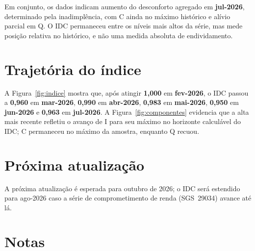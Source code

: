 \documentclass[11pt,a4paper]{article}
\newcommand{\mesref}{jul-2026}
\newcommand{\proxdivulgacao}{outubro de 2026}
\newcommand{\mesproximo}{ago-2026}
\begin{document}
Em conjunto, os dados indicam aumento do desconforto agregado em
\textbf{\mesref}, determinado pela inadimplência, com C ainda no máximo
histórico e alívio parcial em Q. O IDC permaneceu entre os níveis mais altos
da série, mas mede posição relativa no histórico, e não uma medida absoluta
de endividamento.


\section{Trajetória do índice}

A Figura~\ref{fig:indice} mostra que, após atingir \textbf{1,000} em
\textbf{fev-2026}, o IDC passou a \textbf{0,960} em \textbf{mar-2026},
\textbf{0,990} em \textbf{abr-2026}, \textbf{0,983} em \textbf{mai-2026},
\textbf{0,950} em \textbf{jun-2026} e \textbf{0,963} em
\textbf{jul-2026}. A Figura~\ref{fig:componentes} evidencia que a alta mais
recente refletiu o avanço de I para seu máximo no horizonte calculável do
IDC; C permaneceu no máximo da amostra, enquanto Q recuou.
\section{Próxima atualização}

A próxima atualização é esperada para \proxdivulgacao; o IDC será estendido para
\mesproximo{} caso a série de comprometimento de renda (SGS~29034) avance até lá.

\section*{Notas}
\end{document}
